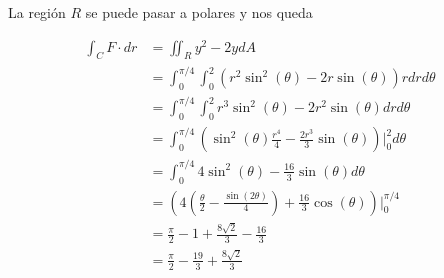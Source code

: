 \documentclass[a4paper]{article}
\begin{document}
La región $R$ se puede pasar a polares y nos queda

\begin{align*}
    \int_C F \cdot dr &= \iint_R y^2-2y dA \\
                    &= \int_0^{\pi/4} \int_0^2 (r^2\sin^2(\theta)-2r\sin(\theta))r drd\theta \\
                    &= \int_0^{\pi/4} \int_0^2 r^3\sin^2(\theta)-2r^2\sin(\theta) drd\theta \\
                    &= \int_0^{\pi/4}\left(\sin^2(\theta)\frac{r^4}{4}-\frac{2r^3}{3}\sin(\theta) \right) \Big|_0^2 d\theta \\
                    &= \int_0^{\pi/4} 4\sin^2(\theta)-\frac{16}{3}\sin(\theta)  d\theta \\
                    &= \left(4\left( \frac{\theta}{2}-\frac{\sin(2\theta)}{4}\right)+\frac{16}{3}\cos(\theta)  \right) \Big|_0^{\pi/4}\\
                    &= \frac{\pi}{2}-1 +\frac{8\sqrt{2}}{3}- \frac{16}{3} \\
                    &= \frac{\pi}{2}-\frac{19}{3} +\frac{8\sqrt{2}}{3}
\end{align*}
\end{document}
